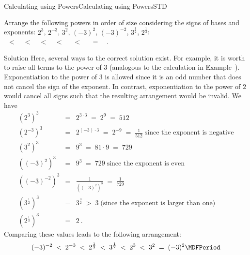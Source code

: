 \begin{MXContent}{Calculating using Powers}{Calculating using Powers}{STD}
\begin{MExercise}
Arrange the following powers in order of size considering the signs of bases and exponents: 
$2^3$, $2^{-3}$, $3^2$, $(-3)^2$, $(-3)^{-2}$, $3^{\frac12}$, $2^{\frac13}$:
\ \\
\ $<$\ 
\ $<$\ 
\ $<$\ 
\ $<$\ 
 \ $<$\ 
 \ $=$\ 
\ .
\ \\
\begin{MHint}{Solution}
Here, several ways to the correct solution exist. For example, it is worth to raise all terms to the 
power of $3$ (analogous to the calculation in Example~). Exponentiation to
the power of $3$ is allowed since it is an odd number that does not cancel the sign of the exponent.
In contrast, exponentiation to the power of $2$ would cancel all signs such that the resulting 
arrangement would be invalid. We have
\begin{eqnarray*}
(2^3)^3 &=& 2^{3\cdot 3} \;=\; 2^9 \;=\; 512\\
(2^{-3})^3 &=& 2^{(-3)\cdot 3}\;=\; 2^{-9} \;=\; \frac1{512}\;\text{since the exponent is negative}\\
(3^2)^3 &=& 9^3 \;=\; 81\cdot9 \;=\; 729\\
((-3)^2)^3 &=& 9^3 \;=\; 729\;\text{since the exponent is even}\\
((-3)^{-2})^3 &=& \frac1{((-3)^2)^3} \;=\; \frac1{729}\\
(3^{\frac12})^3 &=& 3^{\frac32}\; >\; 3 \;\text{(since the exponent is larger than one)}\\
(2^{\frac13})^3 &=& 2\: .
\end{eqnarray*}
Comparing these values leads to the following arrangement:
$$
(-3)^{-2}\;<\;2^{-3}\;<\;2^{\frac13}\;<\;3^{\frac12}\; < \; 2^3\; < \; 3^2 \;=\; (-3)^2\MDFPeriod
$$
\end{MHint}
\end{MExercise}

\end{MXContent}

